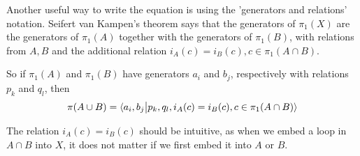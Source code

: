 \begin{rem}[]
Another useful way to write the equation is using the 'generators and relations' notation.
Seifert van Kampen's theorem says that the generators of $\pi_1(X)$ are the generators of $\pi_1(A)$ together with the generators of $\pi_1(B)$, with relations from $A,B$ and the additional relation $i_A(c) =i_B(c), c \in \pi_1(A \cap B)$.

So if $\pi_1(A)$ and $\pi_1(B)$ have generators $a_i$ and $b_j$, respectively with relations $p_k$ and $q_l$, then
\begin{align*}
  \pi(A \cup B) = \langle a_i,b_j\big\vert p_k, q_l, i_A(c) = i_B(c), c \in \pi_1(A \cap B)\rangle
\end{align*}

The relation $i_A(c) = i_B(c)$ should be intuitive, as when we embed a loop in $A \cap B$ into $X$, it does not matter if we first embed it into $A$ or $B$.
\end{rem}

